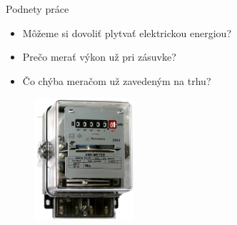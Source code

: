 \documentclass[hyperref={unicode}]{beamer}
\begin{document}
\begin{frame}{Podnety práce}
	\begin{itemize}
		\item Môžeme si dovoliť plytvať elektrickou energiou?
		\item Prečo merať výkon už pri zásuvke?
		\item Čo chýba meračom už zavedeným na trhu?
	\end{itemize}

	\def \myGraphicsHeight {4.5cm}
	\begin{figure}[htp]
		\centering
		\includegraphics[height=\myGraphicsHeight]{analog-power-meter}
		\hspace{1cm}

\end{figure}
\end{frame}
\end{document}
